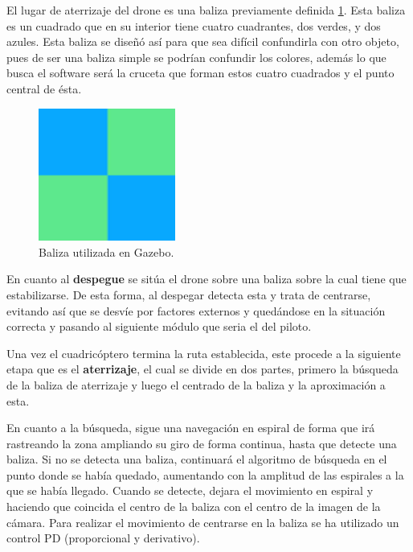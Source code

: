 \hspace{1cm} El lugar de aterrizaje del drone es una baliza previamente definida \ref{fig:Baliza.}. Esta baliza es un cuadrado que en su interior tiene cuatro cuadrantes, dos verdes, y dos azules. Esta baliza se diseñó así para que sea difícil confundirla con otro objeto, pues de ser una baliza simple se podrían confundir los colores, además lo que busca el software será la cruceta que forman estos cuatro cuadrados y el punto central de ésta.

\begin{figure}[H]
	\begin{center}
		\includegraphics[width=0.4\textwidth]{imag/IMG33.png}
				\caption{Baliza utilizada en Gazebo.}
		\label{fig:Baliza.}	
	\end{center}
\end{figure}

\hspace{1cm} En cuanto al \textbf{despegue} se sitúa el drone sobre una baliza sobre la cual tiene que estabilizarse. De esta forma, al despegar detecta esta y trata de centrarse, evitando así que se desvíe por factores externos y quedándose en la situación correcta y pasando al siguiente módulo que seria el del piloto. 

\hspace{1cm} Una vez el cuadricóptero termina la ruta establecida, este procede a la siguiente etapa que es el \textbf{aterrizaje}, el cual se divide en dos partes, primero la búsqueda de la baliza de aterrizaje y luego el centrado de la baliza y la aproximación a esta. 

\hspace{1cm} En cuanto a la búsqueda, sigue una navegación en espiral de forma que irá rastreando la zona ampliando su giro de forma continua, hasta que
detecte una baliza. Si no se detecta una baliza, continuará el algoritmo de búsqueda en el punto donde se había quedado, aumentando con la amplitud de las espirales a la que se había llegado. Cuando se detecte, dejara el movimiento en espiral y haciendo que coincida el centro de la baliza con el centro de la imagen de la cámara.  Para realizar el movimiento de centrarse en la baliza se ha utilizado un control PD (proporcional y derivativo).  

